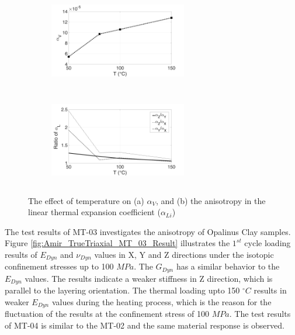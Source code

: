 \begin{figure}[!ht]
\centering
\begin{subfigure}[c]{0.48\textwidth}
\centering
\includegraphics[width=6cm,height=4cm]{figures/Amir_TrueTriaxial_MT_02_Result_1a.png}
\subcaption{}
\label{fig:Amir_TrueTriaxial_MT_02_Result_1a}
\end{subfigure}
\hfill
\begin{subfigure}[c]{0.48\textwidth}
\centering
\includegraphics[width=6cm,height=4cm]{figures/Amir_TrueTriaxial_MT_02_Result_1b.png}
\subcaption{}
\label{fig:Amir_TrueTriaxial_MT_02_Result_1b}
\end{subfigure}
\caption{The effect of temperature on (a) $\alpha_V$, and (b) the anisotropy in the linear thermal expansion coefficient ($\alpha_{Li}$)}
\end{figure}

The test results of MT-03 investigates the anisotropy of Opalinus Clay samples. Figure \ref{fig:Amir_TrueTriaxial_MT_03_Result} illustrates the $1^{st}$ cycle loading results of $E_{Dyn}$ and $\nu_{Dyn}$ values in X, Y and Z directions under the isotopic confinement stresses up to 100 $MPa$. The $G_{Dyn}$ has a similar behavior to the $E_{Dyn}$ values. The results indicate a weaker stiffness in Z direction, which is parallel to the layering orientation. The thermal loading upto 150 $^{\circ}C$ results in weaker $E_{Dyn}$ values during the heating process, which is the reason for the fluctuation of the results at the confinement stress of 100 $MPa$. The test results of MT-04 is similar to the MT-02 and the same material response is observed. 

